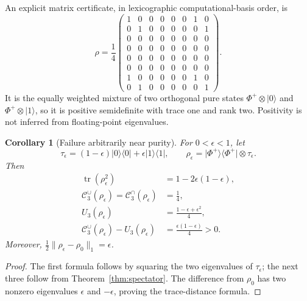 \documentclass[11pt,a4paper]{article}
\newtheorem{corollary}[theorem]{Corollary}
\newcommand{\tr}{\operatorname{tr}}
\newcommand{\CE}{\mathcal C}
\newcommand{\ket}[1]{\lvert #1\rangle}
\newcommand{\bra}[1]{\langle #1\rvert}
\newcommand{\proj}[1]{\ket{#1}\bra{#1}}
\begin{document}
An explicit matrix certificate, in lexicographic computational-basis order, is
\[
 \rho=\frac14
 \begin{pmatrix}
 1&0&0&0&0&0&1&0\\
 0&1&0&0&0&0&0&1\\
 0&0&0&0&0&0&0&0\\
 0&0&0&0&0&0&0&0\\
 0&0&0&0&0&0&0&0\\
 0&0&0&0&0&0&0&0\\
 1&0&0&0&0&0&1&0\\
 0&1&0&0&0&0&0&1
 \end{pmatrix}.
\]
It is the equally weighted mixture of two orthogonal pure states
$\Phi^+\otimes\ket0$ and $\Phi^+\otimes\ket1$, so it is positive semidefinite with trace one and rank two. Positivity is not inferred from floating-point eigenvalues.

\begin{corollary}[Failure arbitrarily near purity]\label{cor:near}
For $0<\epsilon<1$, let
\[
 \tau_\epsilon=(1-\epsilon)\proj0+\epsilon\proj1,
 \qquad \rho_\epsilon=\proj{\Phi^+}\otimes\tau_\epsilon.
\]
Then
\begin{align}
 \tr(\rho_\epsilon^2)&=1-2\epsilon(1-\epsilon),\\
 \CE_3^\cup(\rho_\epsilon)=\CE_3^\cap(\rho_\epsilon)&=\frac14,\\
 U_3(\rho_\epsilon)&=\frac{1-\epsilon+\epsilon^2}{4},\\
 \CE_3^\cup(\rho_\epsilon)-U_3(\rho_\epsilon)&=\frac{\epsilon(1-\epsilon)}{4}>0.
\end{align}
Moreover, $\tfrac12\|\rho_\epsilon-\rho_0\|_1=\epsilon$.
\end{corollary}
\begin{proof}
The first formula follows by squaring the two eigenvalues of $\tau_\epsilon$; the next three follow from Theorem~\ref{thm:spectator}. The difference from $\rho_0$ has two nonzero eigenvalues $\epsilon$ and $-\epsilon$, proving the trace-distance formula.
\end{proof}
\end{document}
